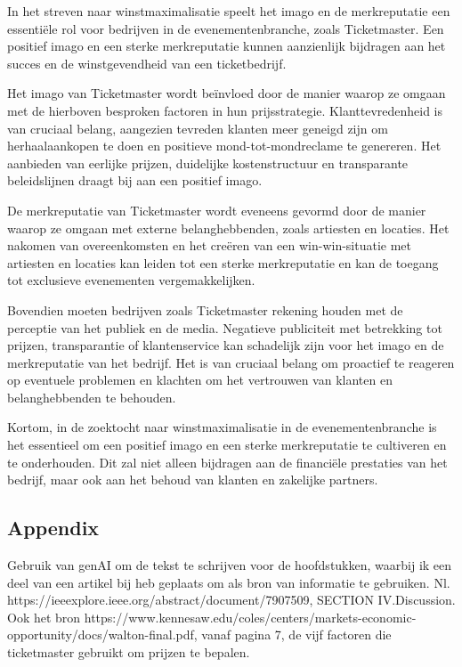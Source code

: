 In het streven naar winstmaximalisatie speelt het imago en de merkreputatie een essentiële rol voor bedrijven in de evenementenbranche, zoals Ticketmaster. Een positief imago en een sterke merkreputatie kunnen aanzienlijk bijdragen aan het succes en de winstgevendheid van een ticketbedrijf.

Het imago van Ticketmaster wordt beïnvloed door de manier waarop ze omgaan met de hierboven besproken factoren in hun prijsstrategie. Klanttevredenheid is van cruciaal belang, aangezien tevreden klanten meer geneigd zijn om herhaalaankopen te doen en positieve mond-tot-mondreclame te genereren. Het aanbieden van eerlijke prijzen, duidelijke kostenstructuur en transparante beleidslijnen draagt bij aan een positief imago.

De merkreputatie van Ticketmaster wordt eveneens gevormd door de manier waarop ze omgaan met externe belanghebbenden, zoals artiesten en locaties. Het nakomen van overeenkomsten en het creëren van een win-win-situatie met artiesten en locaties kan leiden tot een sterke merkreputatie en kan de toegang tot exclusieve evenementen vergemakkelijken.

Bovendien moeten bedrijven zoals Ticketmaster rekening houden met de perceptie van het publiek en de media. Negatieve publiciteit met betrekking tot prijzen, transparantie of klantenservice kan schadelijk zijn voor het imago en de merkreputatie van het bedrijf. Het is van cruciaal belang om proactief te reageren op eventuele problemen en klachten om het vertrouwen van klanten en belanghebbenden te behouden.

Kortom, in de zoektocht naar winstmaximalisatie in de evenementenbranche is het essentieel om een positief imago en een sterke merkreputatie te cultiveren en te onderhouden. Dit zal niet alleen bijdragen aan de financiële prestaties van het bedrijf, maar ook aan het behoud van klanten en zakelijke partners.

\subsection{Appendix}
Gebruik van genAI om de tekst te schrijven voor de hoofdstukken, waarbij ik een deel van een artikel bij heb geplaats om als bron van informatie te gebruiken. Nl. https://ieeexplore.ieee.org/abstract/document/7907509, SECTION IV.Discussion.
Ook het bron https://www.kennesaw.edu/coles/centers/markets-economic-opportunity/docs/walton-final.pdf, vanaf pagina 7, de vijf factoren die ticketmaster gebruikt om prijzen te bepalen.


